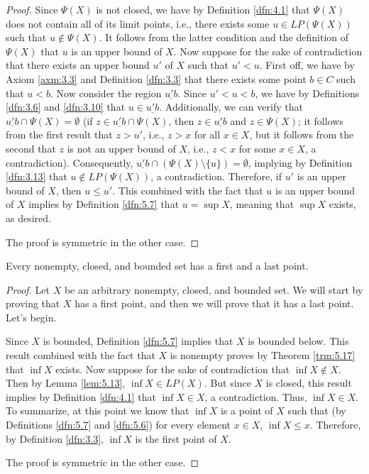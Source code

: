 \documentclass[../main.tex]{subfiles}
\begin{document}
\begin{theorem}
\begin{proof}
        Since $\Psi(X)$ is not closed, we have by Definition \ref{dfn:4.1} that $\Psi(X)$ does not contain all of its limit points, i.e., there exists some $u\in LP(\Psi(X))$ such that $u\notin\Psi(X)$. It follows from the latter condition and the definition of $\Psi(X)$ that $u$ is an upper bound of $X$. Now suppose for the sake of contradiction that there exists an upper bound $u'$ of $X$ such that $u'<u$. First off, we have by Axiom \ref{axm:3.3} and Definition \ref{dfn:3.3} that there exists some point $b\in C$ such that $u<b$. Now consider the region $\underline{u'b}$. Since $u'<u<b$, we have by Definitions \ref{dfn:3.6} and \ref{dfn:3.10} that $u\in\underline{u'b}$. Additionally, we can verify that $\underline{u'b}\cap\Psi(X)=\emptyset$ (if $z\in\underline{u'b}\cap\Psi(X)$, then $z\in\underline{u'b}$ and $z\in\Psi(X)$; it follows from the first result that $z>u'$, i.e., $z>x$ for all $x\in X$, but it follows from the second that $z$ is not an upper bound of $X$, i.e., $z<x$ for some $x\in X$, a contradiction). Consequently, $\underline{u'b}\cap(\Psi(X)\setminus\{u\})=\emptyset$, implying by Definition \ref{dfn:3.13} that $u\notin LP(\Psi(X))$, a contradiction. Therefore, if $u'$ is an upper bound of $X$, then $u\leq u'$. This combined with the fact that $u$ is an upper bound of $X$ implies by Definition \ref{dfn:5.7} that $u=\sup X$, meaning that $\sup X$ exists, as desired.\par\medskip
        The proof is symmetric in the other case.
    \end{proof}
\end{theorem}

\begin{corollary}\label{cly:5.18}
    Every nonempty, closed, and bounded set has a first and a last point.
    \begin{proof}
        Let $X$ be an arbitrary nonempty, closed, and bounded set. We will start by proving that $X$ has a first point, and then we will prove that it has a last point. Let's begin.\par
        Since $X$ is bounded, Definition \ref{dfn:5.7} implies that $X$ is bounded below. This result combined with the fact that $X$ is nonempty proves by Theorem \ref{trm:5.17} that $\inf X$ exists. Now suppose for the sake of contradiction that $\inf X\notin X$. Then by Lemma \ref{lem:5.13}, $\inf X\in LP(X)$. But since $X$ is closed, this result implies by Definition \ref{dfn:4.1} that $\inf X\in X$, a contradiction. Thus, $\inf X\in X$. To summarize, at this point we know that $\inf X$ is a point of $X$ such that (by Definitions \ref{dfn:5.7} and \ref{dfn:5.6}) for every element $x\in X$, $\inf X\leq x$. Therefore, by Definition \ref{dfn:3.3}, $\inf X$ is the first point of $X$.\par
        The proof is symmetric in the other case.
    \end{proof}
\end{corollary}
\end{document}
